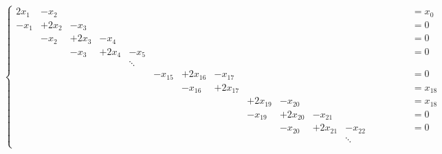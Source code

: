 \documentclass[A4,11pt]{article}
\begin{document}
\thispagestyle{empty}

$$
\left\{
\begin{array}{cccccccccccccccccl}
2x_1  & -x_2  &       &         &        &          &           &          &                   &            &          &         &        &          &          &          &                   &= x_0 \\
-x_1  & +2x_2 & -x_3  &         &        &          &           &          &                   &            &          &         &        &          &          &          &                   &= 0 \\
      & -x_2  & +2x_3 & -x_4    &        &          &           &          &                   &            &          &         &        &          &          &          &                   &= 0 \\
      &       & -x_3  & +2x_4   & -x_5   &          &           &          &                   &            &          &         &        &          &          &          &                   &= 0 \\
      &       &       &         & \ddots &          &           &          &                   &            &          &         &        &          &          &          &                   &    \\
      &       &       &         &        &  -x_{15} &  +2x_{16} & -x_{17}  &                   &            &          &         &        &          &          &          &                   &= 0      \\
      &       &       &         &        &          &  -x_{16}  & +2x_{17} &                   &            &          &         &        &          &          &          &                   &= x_{18} \\
      &       &       &         &        &          &           &          &          +2x_{19} & -x_{20}    &          &         &        &          &          &          &                   &= x_{18} \\
      &       &       &         &        &          &           &          &           -x_{19} & +2x_{20}   & -x_{21}  &         &        &          &          &          &                   &= 0 \\
      &       &       &         &        &          &           &          &                   & -x_{20}    & +2x_{21} & -x_{22} &        &          &          &          &                   &= 0 \\
      &       &       &         &        &          &           &          &                   &            &          &  \ddots &        &          &          &          &                   &    \\

\end{array}$$
\end{document}
